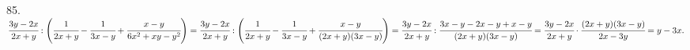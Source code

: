 85. $\cfrac{3y-2x}{2x+y}:\left(\cfrac{1}{2x+y}-\cfrac{1}{3x-y}+\cfrac{x-y}{6x^2+xy-y^2}\right)=
\cfrac{3y-2x}{2x+y}:\left(\cfrac{1}{2x+y}-\cfrac{1}{3x-y}+\cfrac{x-y}{(2x+y)(3x-y)}\right)=
\cfrac{3y-2x}{2x+y}:\cfrac{3x-y-2x-y+x-y}{(2x+y)(3x-y)}=\cfrac{3y-2x}{2x+y}\cdot\cfrac{(2x+y)(3x-y)}{2x-3y}=y-3x.$\\
